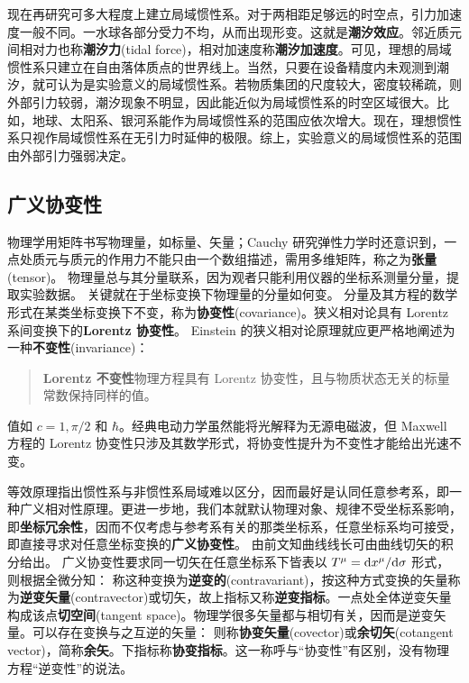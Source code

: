 现在再研究可多大程度上建立局域惯性系。对于两相距足够远的时空点，引力加速度一般不同。一水球各部分受力不均，从而出现形变。这就是\textbf{潮汐效应}。邻近质元间相对力也称\textbf{潮汐力}(tidal force)，相对加速度称\textbf{潮汐加速度}。可见，理想的局域惯性系只建立在自由落体质点的世界线上。当然，只要在设备精度内未观测到潮汐，就可认为是实验意义的局域惯性系。若物质集团的尺度较大，密度较稀疏，则外部引力较弱，潮汐现象不明显，因此能近似为局域惯性系的时空区域很大。比如，地球、太阳系、银河系能作为局域惯性系的范围应依次增大。现在，理想惯性系只视作局域惯性系在无引力时延伸的极限。综上，实验意义的局域惯性系的范围由外部引力强弱决定。

\subsection{广义协变性}

物理学用矩阵书写物理量，如标量、矢量；Cauchy 研究弹性力学时还意识到，一点处质元与质元的作用力不能只由一个数组描述，需用多维矩阵，称之为\textbf{张量}(tensor)。
物理量总与其分量联系，因为观者只能利用仪器的坐标系测量分量，提取实验数据。
关键就在于坐标变换下物理量的分量如何变。
分量及其方程的数学形式在某类坐标变换下不变，称为\textbf{协变性}(covariance)。狭义相对论具有 Lorentz 系间变换下的\textbf{Lorentz 协变性}。
Einstein 的狭义相对论原理就应更严格地阐述为一种\textbf{不变性}(invariance)：
\begin{quote}
    \textbf{Lorentz 不变性}\quad 物理方程具有 Lorentz 协变性，且与物质状态无关的标量常数保持同样的值。
\end{quote}
值如 $c=1,\pi/2$ 和 $\hbar$。经典电动力学虽然能将光解释为无源电磁波，但 Maxwell 方程的 Lorentz 协变性只涉及其数学形式，将协变性提升为不变性才能给出光速不变。

等效原理指出惯性系与非惯性系局域难以区分，因而最好是认同任意参考系，即一种广义相对性原理。更进一步地，我们本就默认物理对象、规律不受坐标系影响，即\textbf{坐标冗余性}，因而不仅考虑与参考系有关的那类坐标系，任意坐标系均可接受，即直接寻求对任意坐标变换的\textbf{广义协变性}。
由前文知曲线线长可由曲线切矢的积分给出。
广义协变性要求同一切矢在任意坐标系下皆表以 $T^\mu=\dd x^\mu/\dd\sigma$ 形式，则根据全微分知：
称这种变换为\textbf{逆变的}(contravariant)，按这种方式变换的矢量称为\textbf{逆变矢量}(contravector)或切矢，故上指标又称\textbf{逆变指标}。一点处全体逆变矢量构成该点\textbf{切空间}(tangent space)。物理学很多矢量都与相切有关，因而是逆变矢量。可以存在变换与之互逆的矢量：
则称\textbf{协变矢量}(covector)或\textbf{余切矢}(cotangent vector)，简称\textbf{余矢}。下指标称\textbf{协变指标}。这一称呼与“协变性”有区别，没有物理方程“逆变性”的说法。


